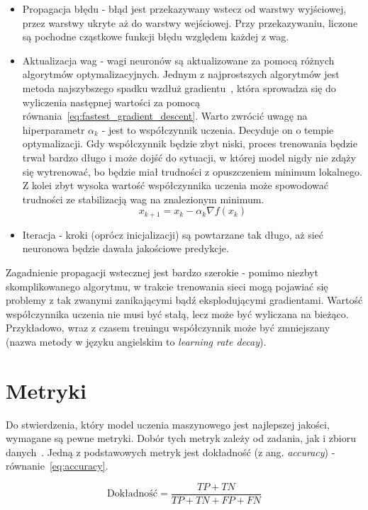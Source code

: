 \begin{itemize}
    \item Propagacja błędu - błąd jest przekazywany wstecz od warstwy wyjściowej, przez warstwy ukryte aż do warstwy wejściowej.
    Przy przekazywaniu, liczone są pochodne cząstkowe funkcji błędu względem każdej z wag.
    \item Aktualizacja wag - wagi neuronów są aktualizowane za pomocą różnych algorytmów optymalizacyjnych.
    Jednym z najprostszych algorytmów jest metoda najszybszego spadku wzdłuż gradientu~\cite{gradient_descent}, która sprowadza się do wyliczenia następnej wartości za pomocą równania~\ref{eq:fastest_gradient_descent}.
    Warto zwrócić uwagę na hiperparametr $\alpha_k$ - jest to współczynnik uczenia.
    Decyduje on o tempie optymalizacji.
    Gdy współczynnik będzie zbyt niski, proces trenowania będzie trwał bardzo długo i może dojść do sytuacji, w której model nigdy nie zdąży się wytrenować, bo będzie miał trudności z opuszczeniem minimum lokalnego.
    Z kolei zbyt wysoka wartość współczynnika uczenia może spowodować trudności ze stabilizacją wag na znalezionym minimum.
    \begin{equation}
        x_{k+1} = x_k - \alpha_k \nabla f(x_k)\label{eq:fastest_gradient_descent}
    \end{equation}
    \item Iteracja - kroki (oprócz inicjalizacji) są powtarzane tak długo, aż sieć neuronowa będzie dawała jakościowe predykcje.
\end{itemize}

Zagadnienie propagacji wstecznej jest bardzo szerokie - pomimo niezbyt skomplikowanego algorytmu, w trakcie trenowania sieci mogą pojawiać się problemy z tak zwanymi zanikającymi bądź eksplodującymi gradientami.
Wartość współczynnika uczenia nie musi być stałą, lecz może być wyliczana na bieżąco.
Przykładowo, wraz z czasem treningu współczynnik może być zmniejszany (nazwa metody w języku angielskim to \textit{learning rate decay}).


\section{Metryki}

Do stwierdzenia, który model uczenia maszynowego jest najlepszej jakości, wymagane są pewne metryki.
Dobór tych metryk zależy od zadania, jak i zbioru danych~\cite{metrics}.
Jedną z podstawowych metryk jest dokładność (z ang. \textit{accuracy}) - równanie~\ref{eq:accuracy}.

\begin{equation}
    \text{Dokładność} = \frac{TP + TN}{TP + TN + FP + FN}\label{eq:accuracy}
\end{equation}

